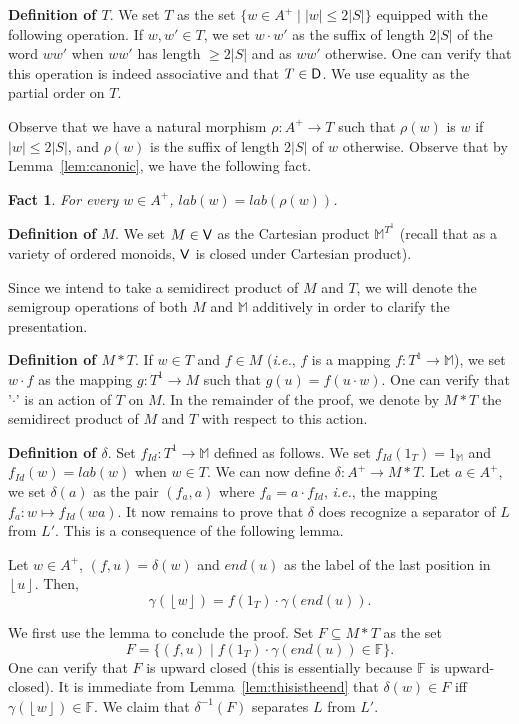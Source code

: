 \documentclass[a4paper,USenglish]{lipics}
\newcommand\Mbb{\ensuremath{\mathbb{M}}\xspace}
\newcommand\Fbb{\ensuremath{\mathbb{F}}\xspace}
\newcommand\Vbf{\ensuremath{{\sf V}}\xspace}
\newcommand\Dbf{\ensuremath{{\sf D}}\xspace}
\newcommand{\croch}[1]{\ensuremath{\left\lfloor #1 \right\rfloor}\xspace}
\newcommand\highlight[1]{\par\bigskip\noindent\textbf{\sffamily #1}.}
\theoremstyle{plain}
\newtheorem{fact}[theorem]{Fact}
\begin{document}
\highlight{Definition of $T$} We set $T$ as the set $\{w \in A^+ \mid |w|
\leqslant 2|S|\}$ equipped with the following operation. If $w,w'\in T$,
we set $w \cdot w'$ as the suffix of length $2|S|$ of the word $ww'$
when $ww'$ has length $\geq 2|S|$ and as $ww'$ otherwise. One can
verify that this operation is indeed associative and that $T \in
\Dbf$. We use equality as the partial order on $T$.

Observe that we have a natural morphism $\rho: A^+ \rightarrow T$
such that $\rho(w)$ is $w$ if $|w| \leqslant 2|S|$, and $\rho(w)$ is the suffix of
length $2|S|$ of $w$ otherwise. Observe that by Lemma~\ref{lem:canonic},
we have the following fact.

\begin{fact} \label{fct:canonic}
For every $w \in A^+$, $lab(w) = lab(\rho(w))$.
\end{fact}

\highlight{Definition of $M$} We set $M \in \Vbf$ as the Cartesian
product $\Mbb^{T^1}$ (recall that as a variety of ordered monoids,
\Vbf is closed under Cartesian product).

\begin{remark}
Since we intend to take a semidirect product of $M$ and $T$, we will
denote the semigroup operations of both $M$ and $\Mbb$ additively in
order to clarify the presentation.
\end{remark}

\highlight{Definition of $M * T$} If $w \in T$ and $f \in M$ (\emph{i.e.}, $f$
is a mapping $f: T^1 \rightarrow \Mbb$), we set $w \cdot f$ as the
mapping $g: T^1 \rightarrow M$ such that $g(u) = f(u \cdot w)$. One
can verify that '$\cdot$' is an action of $T$ on $M$. In the remainder
of the proof, we denote by $M * T$ the semidirect product of $M$ and
$T$ with respect to this action.

\highlight{Definition of $\delta$} Set $f_{Id}: T^1 \rightarrow \Mbb$
defined as follows. We set $f_{Id}(1_T) = 1_\Mbb$ and $f_{Id}(w) =
lab(w)$ when $w \in T$. We can now define $\delta: A^+ \rightarrow M *
T$. Let $a \in A^+$, we set $\delta(a)$ as the pair $(f_a,a)$ where
$f_a = a \cdot f_{Id}$, \emph{i.e.}, the mapping $f_a: w \mapsto
f_{Id}(wa)$. It now remains to prove that $\delta$ does recognize a
separator of $L$ from $L'$. This is a consequence of the following
lemma.

\begin{lemma} \label{lem:thisistheend}
Let $w \in A^+$, $(f,u) = \delta(w)$ and $end(u)$ as the label of the
last position in $\croch{u}$. Then,
\[
\gamma(\croch{w}) = f(1_T) \cdot \gamma(end(u)).
\]
\end{lemma}
We first use the lemma to conclude the proof. Set $F \subseteq M *
T$ as the set \[F = \{(f,u) \mid f(1_T) \cdot \gamma(end(u)) \in
\Fbb\}.\] One can verify that $F$ is upward closed (this is essentially
because \Fbb is upward-closed). It is immediate from
Lemma~\ref{lem:thisistheend} that $\delta(w) \in F$ iff
$\gamma(\croch{w}) \in \Fbb$. We claim that $\delta^{-1}(F)$ separates
$L$ from $L'$.
\end{document}
